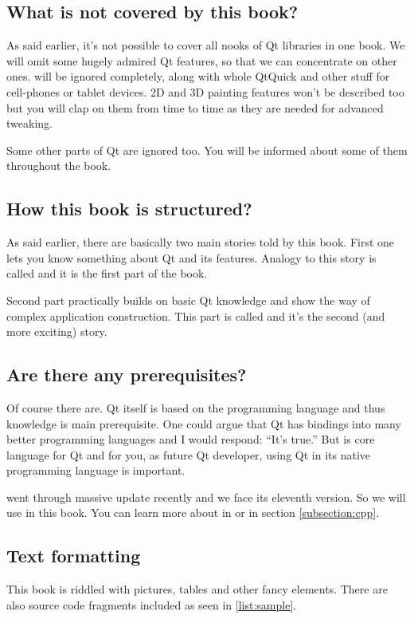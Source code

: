 
\subsection*{What is not covered by this book?}
As said earlier, it's not possible to cover all nooks of Qt libraries in one book. We will omit some hugely admired Qt features, so that we can concentrate on other ones.  will be ignored completely, along with whole QtQuick and other stuff for cell-phones or tablet devices. 2D and 3D painting features won't be described too but you will clap on them from time to time as they are needed for advanced  tweaking.

Some other parts of Qt are ignored too. You will be informed about some of them throughout the book.

\subsection*{How this book is structured?}
As said earlier, there are basically two main stories told by this book. First one lets you know something about Qt and its features. Analogy to this story is called  and it is the first part of the book.

Second part practically builds on basic Qt knowledge and show the way of complex application construction. This part is called  and it's the second (and more exciting) story.

\subsection*{Are there any prerequisites?}
Of course there are. Qt itself is based on the \cpp programming language and thus \cpp knowledge is main prerequisite. One could argue that Qt has bindings into many better programming languages and I would respond: \enquote{It's true.} But \cpp is core language for Qt and for you, as future Qt developer, using Qt in its native programming language is important.

\cpp went through massive update recently and we face its eleventh version. So we will use  in this book. You can learn more about  in \citep{various:cppstandard} or in section \ref{subsection:cpp}.

\subsection*{Text formatting}
This book is riddled with pictures, tables and other fancy elements. There are also source code fragments included as seen in \autoref{list:sample}.

